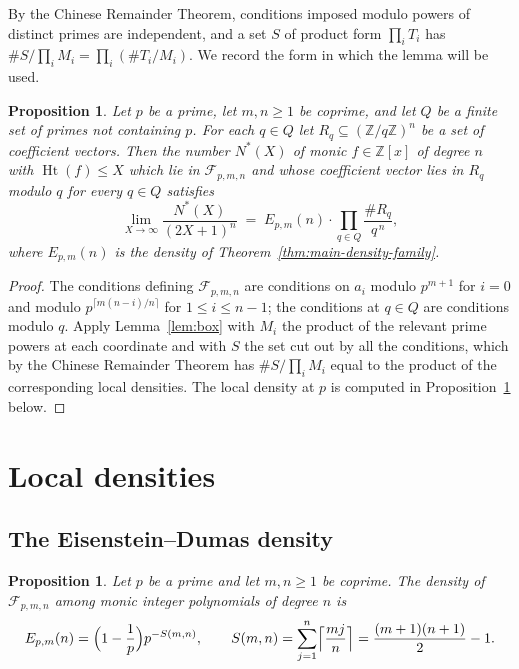 \documentclass[11pt,reqno]{amsart}
\theoremstyle{plain}
\newtheorem{proposition}[theorem]{Proposition}
\theoremstyle{definition}
\theoremstyle{remark}
\newcommand{\Z}{\mathbb{Z}}
\newcommand{\Ht}{\operatorname{Ht}}
\begin{document}
By the Chinese Remainder Theorem, conditions imposed modulo powers of distinct primes are
independent, and a set $S$ of product form $\prod_i T_i$ has $\#S/\prod_i M_i=\prod_i(\#T_i/M_i)$.
We record the form in which the lemma will be used.

\begin{proposition}\label{prop:localdensities}
Let $p$ be a prime, let $m,n\ge1$ be coprime, and let $Q$ be a finite set of primes not containing
$p$. For each $q\in Q$ let $R_q\subseteq(\Z/q\Z)^n$ be a set of coefficient vectors. Then the
number $N^{*}(X)$ of monic $f\in\Z[x]$ of degree $n$ with $\Ht(f)\le X$ which lie in
$\mathcal F_{p,m,n}$ and whose coefficient vector lies in $R_q$ modulo $q$ for every $q\in Q$
satisfies
\[
  \lim_{X\to\infty}\frac{N^{*}(X)}{(2X+1)^n}\;=\;E_{p,m}(n)\cdot\prod_{q\in Q}\frac{\#R_q}{q^{\,n}},
\]
where $E_{p,m}(n)$ is the density of Theorem~\ref{thm:main-density-family}.
\end{proposition}

\begin{proof}
The conditions defining $\mathcal F_{p,m,n}$ are conditions on $a_i$ modulo $p^{m+1}$ for $i=0$
and modulo $p^{\lceil m(n-i)/n\rceil}$ for $1\le i\le n-1$; the conditions at $q\in Q$ are
conditions modulo $q$. Apply Lemma~\ref{lem:box} with $M_i$ the product of the relevant prime
powers at each coordinate and with $S$ the set cut out by all the conditions, which by the Chinese
Remainder Theorem has $\#S/\prod_iM_i$ equal to the product of the corresponding local densities.
The local density at $p$ is computed in Proposition~\ref{prop:E} below.
\end{proof}

\section{Local densities}\label{sec:local}

\subsection{The Eisenstein--Dumas density}

\begin{proposition}\label{prop:E}
Let $p$ be a prime and let $m,n\ge1$ be coprime. The density of $\mathcal F_{p,m,n}$ among monic
integer polynomials of degree $n$ is
\[
  E_{p,m}(n)=\Bigl(1-\frac1p\Bigr)p^{-S(m,n)},\qquad S(m,n)=\sum_{j=1}^{n}\Bigl\lceil\frac{mj}{n}\Bigr\rceil
  =\frac{(m+1)(n+1)}{2}-1 .
\]
\end{proposition}
\end{document}
